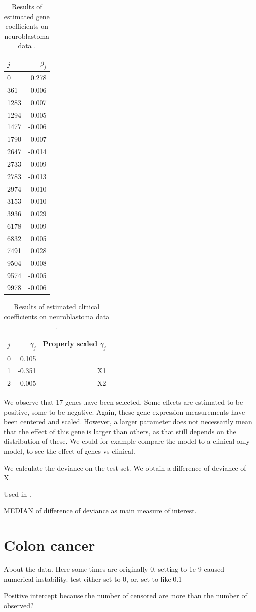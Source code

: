 \begin{table}
\caption{Results of estimated gene coefficients on neuroblastoma data \citep{oberthuer-data}.}
\label{tab:oberthuer-beta}
\begin{tabular}{l|r}
$j$ & $\beta_j$ \\
\hline
0    &  0.278 \\
361  & -0.006 \\
1283 &  0.007 \\
1294 & -0.005 \\
1477 & -0.006 \\
1790 & -0.007 \\
2647 & -0.014 \\
2733 &  0.009 \\
2783 & -0.013 \\
2974 & -0.010 \\
3153 &  0.010 \\
3936 &  0.029 \\
6178 & -0.009 \\
6832 &  0.005 \\
7491 &  0.028 \\
9504 &  0.008 \\
9574 & -0.005 \\
9978 & -0.006
\end{tabular}
\end{table}

\begin{table}
\caption{Results of estimated clinical coefficients on neuroblastoma data \citep{oberthuer-data}.}
\label{tab:oberthuer-gamma}
\begin{tabular}{l|rr}
$j$ & $\gamma_j$ & Properly scaled $\gamma_j$\\
\hline
0 &  0.105 &  \\
1 &  -0.351 & X1 \\
2 &   0.005 & X2
\end{tabular}
\end{table}

We observe that 17 genes have been selected. Some effects are estimated to be positive, some to be negative.
Again, these gene expression measurements have been centered and scaled.
However, a larger parameter does not necessarily mean that the effect of this gene is larger than others, as that still depends on the distribution of these.
We could for example compare the model to a clinical-only model, to see the effect of genes vs clinical.

We calculate the deviance on the test set.
We obtain a difference of deviance of X.

Used in \citep{bovelstad2009}.

\citet{bovelstad2007}


MEDIAN of difference of deviance as main measure of interest.


\section{Colon cancer}
\citep{marisa-data}
About the data.
Here some times are originally 0. setting to 1e-9 caused numerical instability. test either set to 0, or, set to like 0.1

Positive intercept because the number of censored are more than the number of observed?